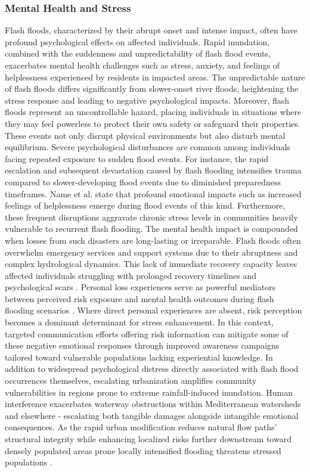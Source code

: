 \subsubsection{Mental Health and Stress}
Flash floods, characterized by their abrupt onset and intense impact, often have profound psychological effects on affected individuals. Rapid inundation, combined with the suddenness and unpredictability of flash flood events, exacerbates mental health challenges such as stress, anxiety, and feelings of helplessness experienced by residents in impacted areas. The unpredictable nature of flash floods differs significantly from slower-onset river floods, heightening the stress response and leading to negative psychological impacts. Moreover, flash floods represent an uncontrollable hazard, placing individuals in situations where they may feel powerless to protect their own safety or safeguard their properties. These events not only disrupt physical environments but also disturb mental equilibrium.
Severe psychological disturbances are common among individuals facing repeated exposure to sudden flood events. For instance, the rapid escalation and subsequent devastation caused by flash flooding intensifies trauma compared to slower-developing flood events due to diminished preparedness timeframes. Name et al. state that profound emotional impacts such as increased feelings of helplessness emerge during flood events of this kind. Furthermore, these frequent disruptions aggravate chronic stress levels in communities heavily vulnerable to recurrent flash flooding.
The mental health impact is compounded when losses from such disasters are long-lasting or irreparable. Flash floods often overwhelm emergency services and support systems due to their abruptness and complex hydrological dynamics. This lack of immediate recovery capacity leaves affected individuals struggling with prolonged recovery timelines and psychological scars \citep{Laudan2020}.
Personal loss experiences serve as powerful mediators between perceived risk exposure and mental health outcomes during flash flooding scenarios \citep{Zhang2024}. Where direct personal experiences are absent, risk perception becomes a dominant determinant for stress enhancement. In this context, targeted communication efforts offering risk information can mitigate some of these negative emotional responses through improved awareness campaigns tailored toward vulnerable populations lacking experiential knowledge.
In addition to widespread psychological distress directly associated with flash flood occurrences themselves, escalating urbanization amplifies community vulnerabilities in regions prone to extreme rainfall-induced inundation. Human interference exacerbates waterway obstructions within Mediterranean watersheds and elsewhere - escalating both tangible damages alongside intangible emotional consequences. As the rapid urban modification reduces natural flow paths' structural integrity while enhancing localized risks further downstream toward densely populated areas prone locally intensified flooding threatens stressed populations \citep{Kastridis2020}\citep{Amponsah2018}.

